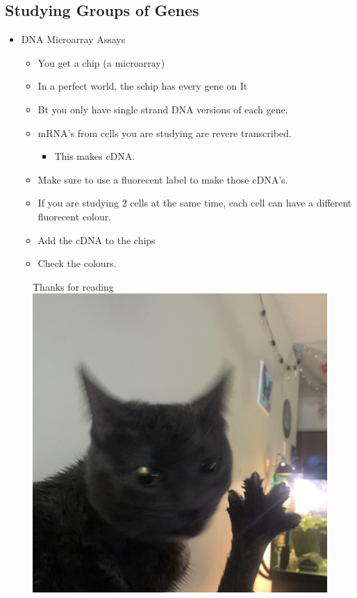\documentclass{report}
\begin{document}

\subsection{Studying Groups of Genes}
\begin{itemize}
	\item DNA Microarray Assays
	\begin{itemize}
		\item You get a chip (a microarray)
		\item In a perfect world, the schip has every gene on It
		\item Bt you only have single strand DNA versions of each gene.
		\item mRNA's from cells you are studying are revere transcribed.
		\begin{itemize}
			\item This makes cDNA.
		\end{itemize}
		\item Make sure to use a fluorecent label to make those cDNA's.
		\item If you are studying 2 cells at the same time, each cell can have a different fluorecent colour.
		\item Add the cDNA to the chips
		\item Check the colours.
	\end{itemize}
\end{itemize}















\newpage
\begin{figure}
	\centering
	\Huge{Thanks for reading}
	\includegraphics[scale=0.2]{dabloon.jpg}
	\label{dabloonia}
\end{figure}
\end{document}
